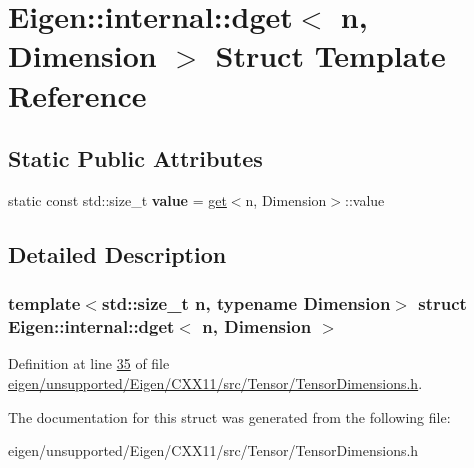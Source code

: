 \hypertarget{struct_eigen_1_1internal_1_1dget}{}\section{Eigen\+:\+:internal\+:\+:dget$<$ n, Dimension $>$ Struct Template Reference}
\label{struct_eigen_1_1internal_1_1dget}
\subsection*{Static Public Attributes}
\begin{DoxyCompactItemize}
\item 
\mbox{\label{struct_eigen_1_1internal_1_1dget_a065d8edcf4de31b214654be5b60ff806}} 
static const std\+::size\+\_\+t {\bfseries value} = \hyperlink{struct_eigen_1_1internal_1_1get}{get}$<$n, Dimension$>$\+::value
\end{DoxyCompactItemize}


\subsection{Detailed Description}
\subsubsection*{template$<$std\+::size\+\_\+t n, typename Dimension$>$\newline
struct Eigen\+::internal\+::dget$<$ n, Dimension $>$}



Definition at line \hyperlink{eigen_2unsupported_2_eigen_2_c_x_x11_2src_2_tensor_2_tensor_dimensions_8h_source_l00035}{35} of file \hyperlink{eigen_2unsupported_2_eigen_2_c_x_x11_2src_2_tensor_2_tensor_dimensions_8h_source}{eigen/unsupported/\+Eigen/\+C\+X\+X11/src/\+Tensor/\+Tensor\+Dimensions.\+h}.



The documentation for this struct was generated from the following file\+:\begin{DoxyCompactItemize}
\item 
eigen/unsupported/\+Eigen/\+C\+X\+X11/src/\+Tensor/\+Tensor\+Dimensions.\+h\end{DoxyCompactItemize}
